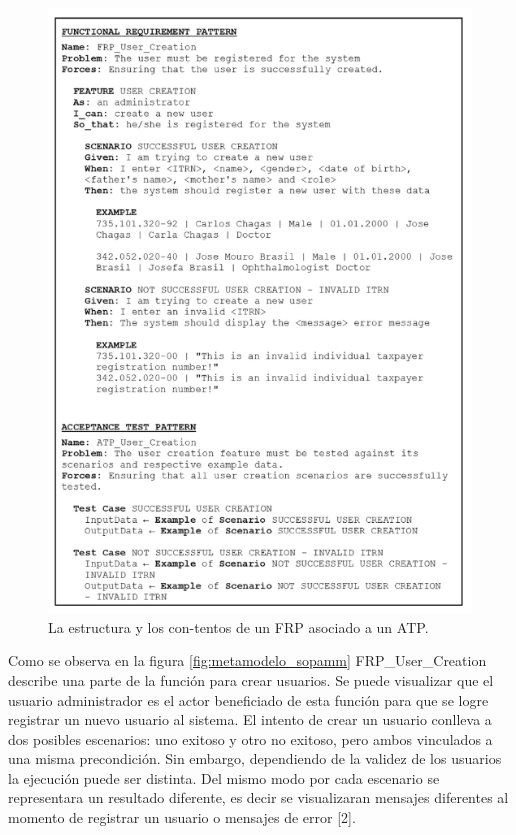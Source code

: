 \begin{figure}[h!]
	\centering
	\includegraphics[width=15cm]{img/metamodelo.png}
	\caption{La estructura y los con-tentos de un FRP asociado a un ATP.}
	\label{fig:metamodelo}
\end{figure}

Como se observa en la figura \ref{fig:metamodelo_sopamm} FRP\_User\_Creation describe una parte de la función para crear usuarios. Se puede visualizar que el usuario administrador es el actor beneficiado de esta función para que se logre registrar un nuevo usuario al sistema. El intento de crear un usuario conlleva a dos posibles escenarios: uno exitoso y otro no exitoso, pero ambos vinculados a una misma precondición.  Sin embargo, dependiendo de la validez de los usuarios la ejecución puede ser distinta. Del mismo modo por cada escenario se representara un resultado diferente, es decir se visualizaran mensajes diferentes al momento de registrar un usuario o mensajes de error [2].

